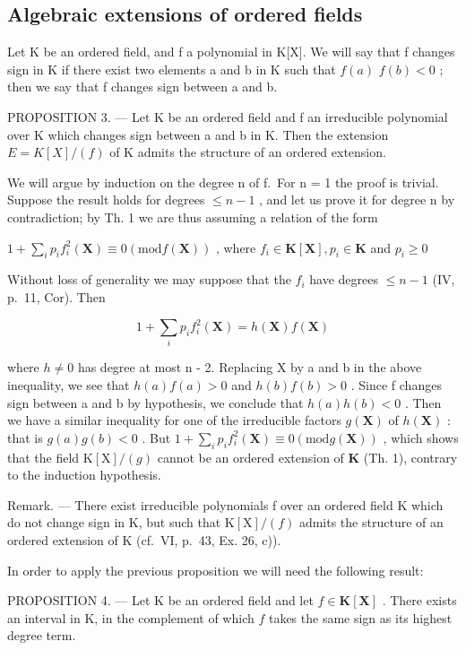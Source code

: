 \subsection{Algebraic extensions of ordered fields}

Let K be an ordered field, and f a polynomial in K{[}X{]}. We will say that f changes sign in K if there exist two elements a and b in K such that \(f(a)\) \(f(b) < 0\) ; then we say that f changes sign between a and b.

PROPOSITION 3. --- Let K be an ordered field and f an irreducible polynomial over K which changes sign between a and b in K. Then the extension \(E = K[X]/(f)\) of K admits the structure of an ordered extension.

We will argue by induction on the degree n of f.~For n = 1 the proof is trivial. Suppose the result holds for degrees \(\leqslant n - 1\) , and let us prove it for degree n by contradiction; by Th. 1 we are thus assuming a relation of the form

\(1 + \sum_{i}p_{i}f_{i}^{2}(\mathbf{X})\equiv 0 (\mathrm{mod} f(\mathbf{X}))\) , where \(f_{i}\in \mathbf{K}[\mathbf{X}], p_{i}\in \mathbf{K}\) and \(p_i\geqslant 0\)

Without loss of generality we may suppose that the \(f_{i}\) have degrees \(\leqslant n - 1\) (IV, p.~11, Cor). Then

\[
1 + \sum_ {i} p _ {i} f _ {i} ^ {2} (\mathbf {X}) = h (\mathbf {X}) f (\mathbf {X})
\]

where \(h \neq 0\) has degree at most n - 2. Replacing X by a and b in the above inequality, we see that \(h(a) f(a) > 0\) and \(h(b) f(b) > 0\) . Since f changes sign between a and b by hypothesis, we conclude that \(h(a) h(b) < 0\) . Then we have a similar inequality for one of the irreducible factors \(g(\mathbf{X})\) of \(h(\mathbf{X})\) : that is \(g(a)g(b) < 0\) . But \(1 + \sum_{i}p_{i}f_{i}^{2}(\mathbf{X})\equiv 0 (\mathrm{mod} g(\mathbf{X}))\) , which shows that the field \(\mathrm{K}[\mathrm{X}] / (g)\) cannot be an ordered extension of \(\mathbf{K}\) (Th. 1), contrary to the induction hypothesis.

Remark. --- There exist irreducible polynomials f over an ordered field K which do not change sign in K, but such that \(\mathrm{K}[\mathrm{X}]/(f)\) admits the structure of an ordered extension of K (cf.~VI, p.~43, Ex. 26, c)).

In order to apply the previous proposition we will need the following result:

PROPOSITION 4. --- Let K be an ordered field and let \(f \in \mathbf{K}[\mathbf{X}]\) . There exists an interval in K, in the complement of which \(f\) takes the same sign as its highest degree term.

